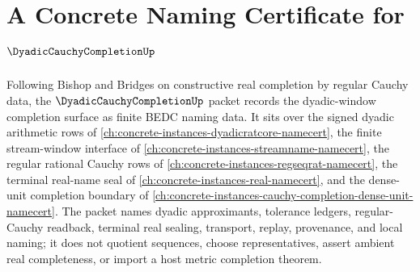 \chapter{A Concrete Naming Certificate for $\DyadicCauchyCompletionUp$}
\label{ch:concrete-instances-dyadic-cauchy-completion-namecert}

Following Bishop and Bridges on constructive real completion by regular Cauchy data, the $\DyadicCauchyCompletionUp$ packet records the dyadic-window completion surface as finite BEDC naming data. It sits over the signed dyadic arithmetic rows of \autoref{ch:concrete-instances-dyadicratcore-namecert}, the finite stream-window interface of \autoref{ch:concrete-instances-streamname-namecert}, the regular rational Cauchy rows of \autoref{ch:concrete-instances-regseqrat-namecert}, the terminal real-name seal of \autoref{ch:concrete-instances-real-namecert}, and the dense-unit completion boundary of \autoref{ch:concrete-instances-cauchy-completion-dense-unit-namecert}. The packet names dyadic approximants, tolerance ledgers, regular-Cauchy readback, terminal real sealing, transport, replay, provenance, and local naming; it does not quotient sequences, choose representatives, assert ambient real completeness, or import a host metric completion theorem.

